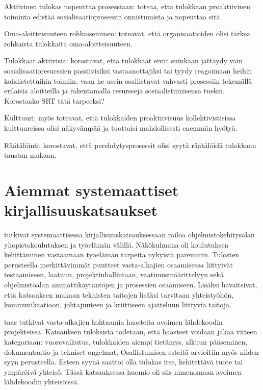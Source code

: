 \documentclass[utf8]{gradu3}
\begin{document}
Aktiivinen tulokas nopeuttaa prosessiaan: \textcite{zhao-ym-2022} toteaa, että tulokkaan proaktiivinen toiminta edistää sosialisaatioprosessin onnistumista ja nopeuttaa sitä. 

Oma-aloitteisuuteen rohkaiseminen: \textcite{zhao-ym-2022} toteavat, että organisaatioiden olisi tärkeä rohkaista tulokkaita oma-aloitteisuuteen.

Tulokkaat aktiivisia: \textcite{zhao-ym-2022} korostavat, että tulokkaat eivät suinkaan jättäydy vain sosialisaatioresurssien passiivisiksi vastaanottajiksi tai tyydy reagoimaan heihin kohdistettuihin toimiin, vaan he usein osallistuvat vahvasti prosessiin tekemällä erilaisia aloitteilla ja rakentamalla resursseja sosiaalistumisensa tueksi. 
Korostaako SRT tätä tarpeeksi?

Kulttuuri: myös \textcite{zhao-ym-2022} toteavat, että  tulokkaiden proaktiivisuus kollektivistisissa kulttuureissa olisi näkyvämpää ja tuottaisi mahdollisesti enemmän hyötyä.

Räätälöinti: \textcite{zhao-ym-2022} korostavat, että perehdytysprosessit olisi syytä räätälöidä tulokkaan taustan mukaan.



\section{Aiemmat systemaattiset kirjallisuuskatsaukset}

\textcite{garousi-ym-2020} tutkivat systemaattisessa kirjallisuuskatsauksessaan railoa ohjelmistokehitysalan yliopistokoulutuksen ja työelämän välillä. Näkökulmana oli koulutuksen kehittäminen vastaamaan työelämän tarpeita nykyistä paremmin. Tulosten perusteella merkittävimmät puutteet vasta-alkajien osaamisessa liittyivät testaamiseen, laatuun, projektinhallintaan, vaatimusmäärittelyyn sekä ohjelmistoalan ammattikäytäntöjen ja prosessien osaamiseen. Lisäksi \textcite{garousi-ym-2020} havaitsivat, että katsauksen mukaan teknisten taitojen lisäksi tarvitaan yhteistyöhön, kommunikaatioon, johtajuuteen ja kriittiseen ajatteluun liittyviä taitoja. 

\textcite{steinmacher-ym-2015} taas tutkivat vasta-alkajien kohtaamia haasteita avoimen lähdekoodin projekteissa. Katsauksen tuloksista todetaan, että haasteet voidaan jakaa viiteen kategoriaan: vuorovaikutus, tulokkaiden aiempi tietämys, alkuun pääseminen, dokumentaatio ja tekniset ongelmat.  Osallistumisen esteitä arvioitiin myös niiden syyn perusteella. Esteen syynä saattoi olla tulokas itse, kehitettävä tuote tai ympäröivä yhteisö. Tässä katsauksessa huomio oli siis nimenomaan avoimen lähdekoodin yhteisöissä.
\end{document}
